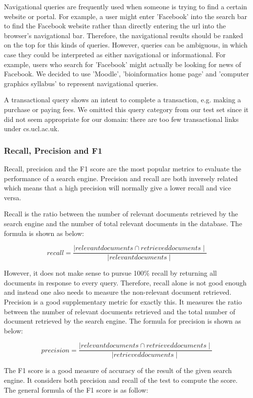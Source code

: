 Navigational queries are frequently used when someone is trying to find a certain website or portal. For example, a user might enter 'Facebook' into the search bar to find the Facebook website rather than directly entering the url into the browser's navigational bar. Therefore, the navigational results should be ranked on the top for this kinds of queries. However, queries can be ambiguous, in which case they could be interpreted as either navigational or informational. For example, users who search for 'Facebook' might actually be looking for news of Facebook. We decided to use 'Moodle', 'bioinformatics home page' and 'computer graphics syllabus' to represent navigational queries.

A transactional query shows an intent to complete a transaction, e.g. making a purchase or paying fees. We omitted this query category from our test set since it did not seem appropriate for our domain: there are too few transactional links under cs.ucl.ac.uk.

\subsubsection{Recall, Precision and F1}
Recall, precision and the F1 score are the most popular metrics to evaluate the performance of a search engine. Precision and recall are both inversely related which means that a high precision will normally give a lower recall and vice versa.

Recall is the ratio between the number of relevant documents retrieved by the search engine and the number of total relevant documents in the database. The formula is shown as below: 

\[recall=\frac{\mid relevant documents\cap retrieved documents\mid}{\mid relevant documents \mid}\]

However, it does not make sense to pursue 100\% recall by returning all documents in response to every query. Therefore, recall alone is not good enough and instead one also needs to measure the non-relevant document retrieved. Precision is a good supplementary metric for exactly this. It measures the ratio between the number of relevant documents retrieved and the total number of document retrieved by the search engine. The formula for precision is shown as below:

\[precision=\frac{\mid relevant documents\cap retrieved documents\mid}{\mid retrieved documents \mid}\]

The F1 score is a good measure of accuracy of the result of the given search engine. It considers both precision and recall of the test to compute the score. The general formula of the F1 score is as follow:

